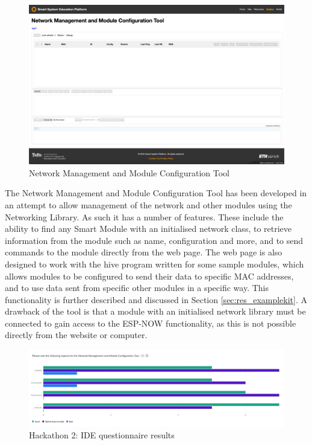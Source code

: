 \begin{figure}[H]
    \centering
    \includegraphics[width=\linewidth]{overleaf/images/nmmct_raw.png}
    \vspace{\ftspace}
    \caption{Network Management and Module Configuration Tool}
    \vspace{\ftspace}
    \label{fig:nmmct_raw}
\end{figure}

The Network Management and Module Configuration Tool has been developed in an attempt to allow management of the network and other modules using the Networking Library. As such it has a number of features. These include the ability to find any Smart Module with an initialised network class, to retrieve information from the module such as name, configuration and more, and to send commands to the module directly from the web page. The web page is also designed to work with the hive program written for some sample modules, which allows modules to be configured to send their data to specific MAC addresses, and to use data sent from specific other modules in a specific way. This functionality is further described and discussed in Section \ref{sec:res_examplekit}.
A drawback of the tool is that a module with an initialised network library must be connected to gain access to the ESP-NOW functionality, as this is not possible directly from the website or computer. 

\begin{figure}[H]
    \centering
    \includegraphics[width=\linewidth]{overleaf/images/nmmct_rating.jpg}
    \vspace{\ftspace}
    \caption{Hackathon 2: IDE questionnaire results}
    \vspace{\ftspace}
    \label{fig:nmmct_q}
\end{figure}


